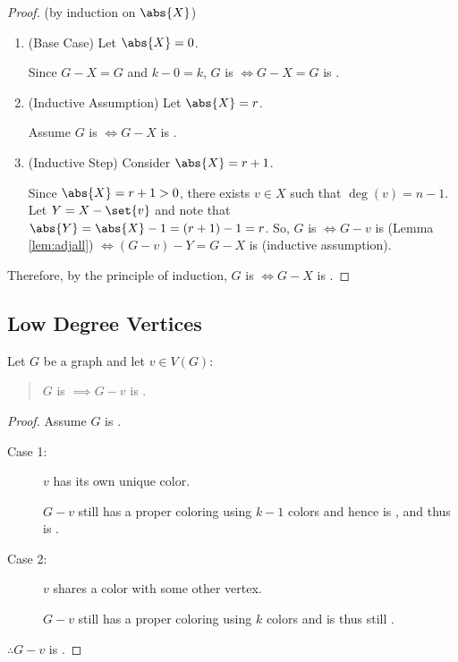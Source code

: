 \begin{proof}
  (by induction on \(\abs{X}\))
  \begin{enumerate}
  \item (Base Case) Let \(\abs{X}=0\).

    Since \(G-X=G\) and \(k-0=k\), \(G\) is  \(\iff G-X=G\) is .

  \item (Inductive Assumption) Let \(\abs{X}=r\).

    Assume \(G\) is  \(\iff G-X\) is .

  \item (Inductive Step) Consider \(\abs{X}=r+1\).
    
    Since \(\abs{X}=r+1>0\), there exists \(v\in X\) such that \(\deg(v)=n-1\).  Let \(Y=X-\set{v}\) and note that
    \(\abs{Y}=\abs{X}-1=(r+1)-1=r\).  So, \(G\) is  \(\iff G-v\) is  (Lemma \ref{lem:adjall})
    \(\iff (G-v)-Y=G-X\) is  (inductive assumption).
  \end{enumerate}

  Therefore, by the principle of induction, \(G\) is  \(\iff G-X\) is .
\end{proof}

\subsection{Low Degree Vertices}

\begin{lemma}
  \label{lem:remone}
  Let \(G\) be a graph and let \(v\in V(G)\):
  \begin{quote}
    \(G\) is  \(\implies G-v\) is .
  \end{quote}
\end{lemma}

\begin{proof}
  
  Assume \(G\) is .

  \begin{description}
  \item[Case 1:] \(v\) has its own unique color.
      
    \(G-v\) still has a proper coloring using \(k-1\) colors and hence is , and thus is .

  \item[Case 2:] \(v\) shares a color with some other vertex.

    \(G-v\) still has a proper coloring using \(k\) colors and is thus still .
  \end{description}

  \(\therefore G-v\) is .
\end{proof}

